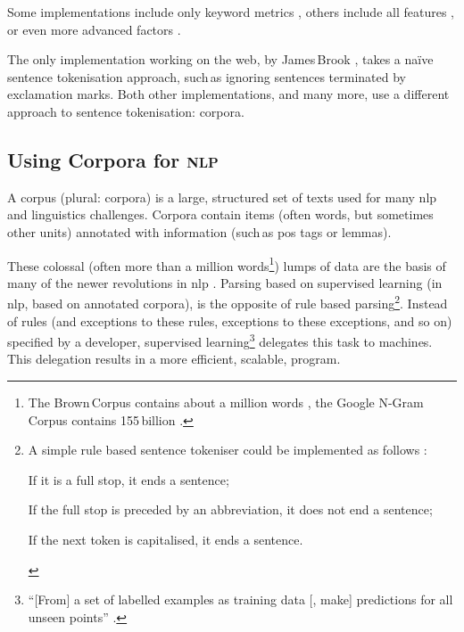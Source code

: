 \noindent Some implementations include only keyword metrics
  \autocite{jbrooksuk/node-summary-source-code}, others include all features
  \autocite{MojoJolo/textteaser-source-code}, or even more advanced factors
  \autocite{summly}.

The only implementation working on the web, by James\,Brook
  \autocite*{jbrooksuk/node-summary-source-code}, takes a na\"ive sentence
  tokenisation approach, such\,as ignoring sentences terminated by
  exclamation marks.
Both other implementations, and many more, use a different approach to
  sentence tokenisation: corpora.

\subsection{Using Corpora for \textsc{nlp}}\label{using-corpora-for}

A corpus (plural: corpora) is a large, structured set of texts used for many
  \gls{nlp} and linguistics challenges.
Corpora contain items (often words, but sometimes other units) annotated
  with information (such\,as \gls{pos} tags or lemmas).

These colossal (often more than a million words\footnote{The Brown\,Corpus
    contains about a million words \autocite{francis-nelson-brown-corpus},
    the Google N-Gram\,Corpus contains 155\,billion
    \autocite{brants-thorsten-google-ngram-corpus}.})
  lumps of data are the basis of many of the newer revolutions in \gls{nlp}
  \autocite{mitkov-ruslan-ea-importance-corpora}.
Parsing based on supervised learning (in \gls{nlp}, based on annotated
  corpora), is the opposite of rule based parsing\footnote{A simple
    rule based sentence tokeniser could be implemented as follows
    \autocite{attivio.com-doing-things-with-sentences}:

    \begin{aenumerate}
      \item If it is a full stop, it ends a sentence;
      \item If the full stop is preceded by an abbreviation, it does not end
        a sentence;
      \item If the next token is capitalised, it ends a sentence.
    \end{aenumerate}}.
Instead of rules (and exceptions to these rules, exceptions to these
  exceptions, and so on) specified by a developer,
  supervised learning\footnote{``{[}From{]} a set of labelled examples as
    training data {[}, make{]} predictions for all unseen points''
    \autocite{mohri-mehryar-foundations-machine-learning}.}
  delegates this task to machines.
This delegation results in a more efficient, scalable, program.

